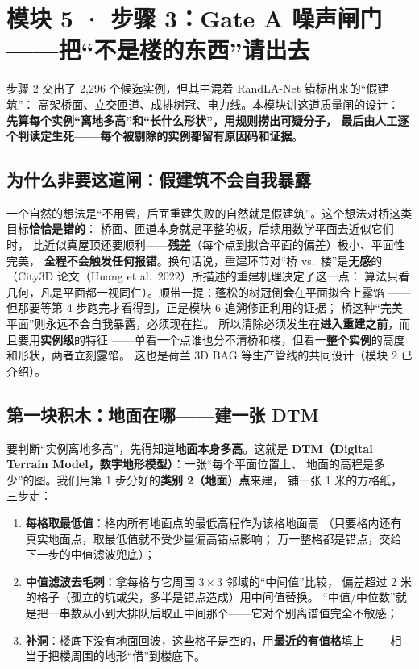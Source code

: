\section{模块 5 · 步骤 3：Gate A 噪声闸门——把``不是楼的东西''请出去}

步骤 2 交出了 2{,}296 个候选实例，但其中混着 RandLA-Net 错标出来的``假建筑''：
高架桥面、立交匝道、成排树冠、电力线。本模块讲这道质量闸的设计：
\textbf{先算每个实例``离地多高''和``长什么形状''，用规则捞出可疑分子，
最后由人工逐个判读定生死——每个被剔除的实例都留有原因码和证据}。

\subsection{为什么非要这道闸：假建筑不会自我暴露}

一个自然的想法是``不用管，后面重建失败的自然就是假建筑''。这个想法对桥这类目标\textbf{恰恰是错的}：
桥面、匝道本身就是平整的板，后续用数学平面去近似它们时，
比近似真屋顶还要顺利——\textbf{残差}（每个点到拟合平面的偏差）极小、平面性完美，
\textbf{全程不会触发任何报错}。换句话说，重建环节对``桥 vs.\ 楼''是\textbf{无感}的
（City3D 论文（Huang et al.\ 2022）所描述的重建机理决定了这一点：
算法只看几何，凡是平面都一视同仁）。顺带一提：蓬松的树冠倒\textbf{会}在平面拟合上露馅
——但那要等第 4 步跑完才看得到，正是模块 6 追溯修正利用的证据；
桥这种``完美平面''则永远不会自我暴露，必须现在拦。
所以清除必须发生在\textbf{进入重建之前}，而且要用\textbf{实例级}的特征
——单看一个点谁也分不清桥和楼，但看\textbf{一整个实例}的高度和形状，两者立刻露馅。
这也是荷兰 3D BAG 等生产管线的共同设计（模块 2 已介绍）。

\subsection{第一块积木：地面在哪——建一张 DTM}

要判断``实例离地多高''，先得知道\textbf{地面本身多高}。这就是
\textbf{DTM（Digital Terrain Model，数字地形模型）}：一张``每个平面位置上、
地面的高程是多少''的图。我们用第 1 步分好的\textbf{类别 2（地面）点}来建，
铺一张 1 米的方格纸，三步走：

\begin{enumerate}
\item \textbf{每格取最低值}：格内所有地面点的最低高程作为该格地面高
      （只要格内还有真实地面点，取最低值就不受少量偏高错点影响；
      万一整格都是错点，交给下一步的中值滤波兜底）；
\item \textbf{中值滤波去毛刺}：拿每格与它周围 $3\times3$ 邻域的``中间值''比较，
      偏差超过 2 米的格子（孤立的坑或尖，多半是错点造成）用中间值替换。
      ``中值/中位数''就是把一串数从小到大排队后取正中间那个——它对个别离谱值完全不敏感；
\item \textbf{补洞}：楼底下没有地面回波，这些格子是空的，用\textbf{最近的有值格}填上
      ——相当于把楼周围的地形``借''到楼底下。
\end{enumerate}

